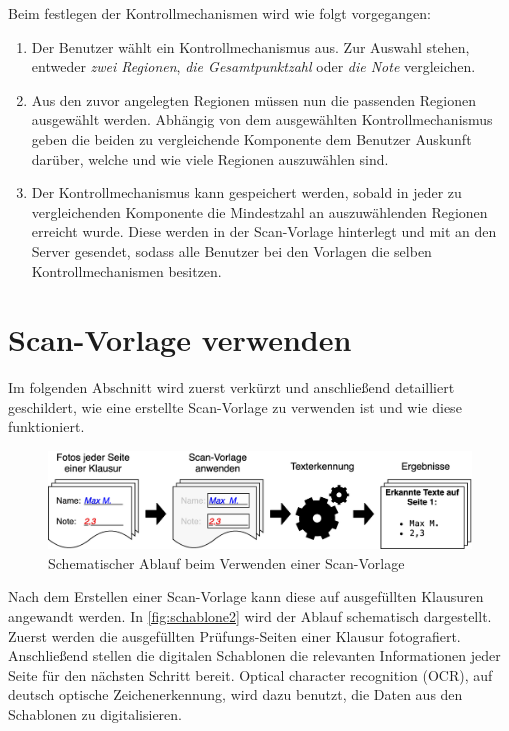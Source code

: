 \documentclass[notables, nomenclature, oneside, 150]{HSMW-Thesis}
\begin{document}
 		Beim festlegen der Kontrollmechanismen wird wie folgt vorgegangen:
 		\begin{enumerate}
 			\item Der Benutzer wählt ein Kontrollmechanismus aus. Zur Auswahl stehen, entweder \textit{zwei Regionen}, \textit{die Gesamtpunktzahl} oder \textit{die Note} vergleichen. 
 			\item Aus den zuvor angelegten Regionen müssen nun die passenden Regionen ausgewählt werden. Abhängig von dem ausgewählten Kontrollmechanismus geben die beiden zu vergleichende Komponente dem Benutzer Auskunft darüber, welche und wie viele Regionen auszuwählen sind.
 			\item Der Kontrollmechanismus kann gespeichert werden, sobald in jeder zu vergleichenden Komponente die Mindestzahl an auszuwählenden Regionen erreicht wurde. Diese werden in der Scan-Vorlage hinterlegt und mit an den Server gesendet, sodass alle Benutzer bei den Vorlagen die selben Kontrollmechanismen besitzen.
 		\end{enumerate}
 		
 	\section{Scan-Vorlage verwenden}
 	
 		Im folgenden Abschnitt wird zuerst verkürzt und anschließend detailliert geschildert, wie eine erstellte Scan-Vorlage zu verwenden ist und wie diese funktioniert.
 	
 		\begin{figure}[th]
    		\centering
    		\includegraphics[width=\textwidth]{img/schablone2}
    		\caption{Schematischer Ablauf beim Verwenden einer Scan-Vorlage}
    		\label{fig:schablone2}
    	\end{figure}
 
 		Nach dem Erstellen einer Scan-Vorlage kann diese auf ausgefüllten Klausuren angewandt werden. In \autoref{fig:schablone2} wird der Ablauf schematisch dargestellt. Zuerst werden die ausgefüllten Prüfungs-Seiten einer Klausur fotografiert. Anschließend stellen die digitalen Schablonen die relevanten Informationen jeder Seite für den nächsten Schritt bereit. Optical character recognition (OCR), auf deutsch optische Zeichenerkennung, wird dazu benutzt, die Daten aus den Schablonen zu digitalisieren. 
		
\end{document}
